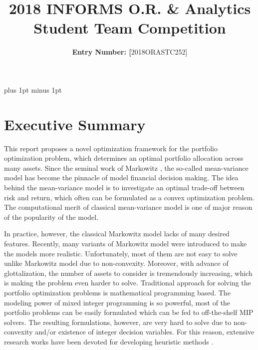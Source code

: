 \documentclass[11pt]{article}
\title{2018 INFORMS O.R. {\&} Analytics Student Team Competition}
\author{\textbf{Entry Number: [}2018ORASTC252]
}
\date{}
\begin{document}
	
	\maketitle
	
	
	\baselineskip16pt plus 1pt minus 1pt
	
	
	
	\section*{Executive Summary}
	
	This report proposes a novel optimization framework for the portfolio optimization problem, which determines an optimal portfolio allocation across many assets. Since the seminal work of Markowitz \citep{markowitz1952portfolio}, the so-called mean-variance model has become the pinnacle of model financial decision making. The idea behind the mean-variance model is to investigate an optimal trade-off between risk and return, which often can be formulated as a convex optimization problem. The computational merit of classical mean-variance model is one of major reason of the popularity of the model. 
	
	In practice, however, the classical Markowitz model lacks of many desired features. 
	Recently, many variants of Markowitz model were introduced to make the models more realistic. Unfortunately, most of them are not easy to solve unlike Markowitz model due to non-convexity. Moreover, with advance of glottalization, the number of assets to consider is tremendously increasing, which is making the problem even harder to solve. Traditional approach for solving the portfolio optimization problems is mathematical programming based. The modeling power of mixed integer programming is so powerful, most of the portfolio problems can be easily formulated which can be fed to off-the-shelf MIP solvers. The resulting formulations, however, are very hard to solve due to non-convexity and/or existence of integer decision variables. For this reason, extensive research works have been devoted for developing heuristic methods \citep{Cesarone:2012ex,WoodsideOriakhi:2011ie}. 
	
\end{document}
